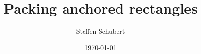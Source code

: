 \documentclass[aspectratio=169]{beamer}
\title[SHORT TITLE]{Packing anchored rectangles}
\subtitle{Steffen Schubert}
\date{\today}
\begin{document}
\begin{frame}
	\maketitle
\end{frame}



\end{document}
